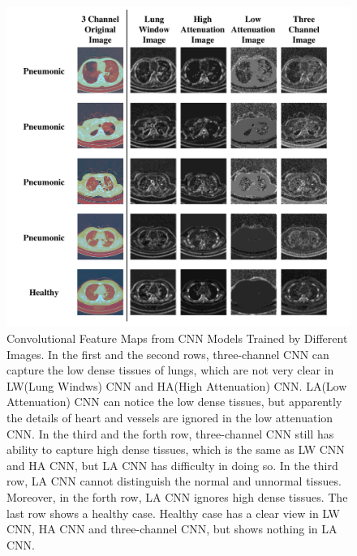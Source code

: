 \documentclass[journal]{IEEEtran}
\begin{document}
\begin{figure}[t]
\centerline{\includegraphics[width=180mm]{show.pdf}}
\vspace{-0cm}
\caption{Convolutional Feature Maps from CNN Models Trained by Different Images. In the first and the second rows, three-channel CNN can capture the low dense tissues of lungs, which are not very clear in LW(Lung Windws) CNN and HA(High Attenuation) CNN. LA(Low Attenuation) CNN can notice the low dense tissues, but apparently the details of heart and vessels are ignored in the low attenuation CNN. 
In the third and the forth row, three-channel CNN still has ability to capture high dense tissues, which is the same as LW CNN and HA CNN, but LA CNN has difficulty in doing so. In the third row, LA CNN cannot distinguish the normal and unnormal tissues. Moreover, in the forth row, LA CNN ignores high dense tissues. The last row shows a healthy case. Healthy case has a clear view in LW CNN, HA CNN and three-channel CNN, but shows nothing in LA CNN.}
\vspace{-0cm}
\label{show}
\end{figure}
\end{document}

